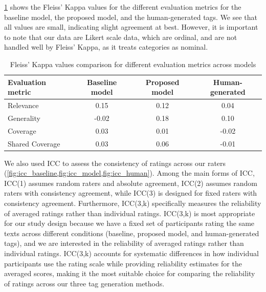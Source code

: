 \cref{tab:fleiss_kappa_comparison} shows the Fleiss' Kappa values for the different evaluation metrics for the baseline model, the proposed model, and the human-generated tags. We see that all values are small, indicating slight agreement at best. However, it is important to note that our data are Likert scale data, which are ordinal, and are not handled well by Fleiss' Kappa, as it treats categories as nominal.

\begin{table}[h]
    \centering
    \begin{tabular}{lccc}
        \hline
        \textbf{Evaluation metric} & \textbf{Baseline model} & \textbf{Proposed model} & \textbf{Human-generated} \\
        \hline
        Relevance                  & 0.15              & 0.12                    & 0.04                     \\
        Generality                 & -0.02             & 0.18                    & 0.10                     \\
        Coverage                   & 0.03              & 0.01                    & -0.02                    \\
        Shared Coverage            & 0.03              & 0.06                    & -0.01                    \\
        \hline
    \end{tabular}
    \caption{Fleiss' Kappa values comparison for different evaluation metrics across models}
    \label{tab:fleiss_kappa_comparison}
\end{table}

We also used ICC to assess the consistency of ratings across our raters (\cref{fig:icc_baseline,fig:icc_model,fig:icc_human}). Among the main forms of ICC, ICC(1) assumes random raters and absolute agreement, ICC(2) assumes random raters with consistency agreement, while ICC(3) is designed for fixed raters with consistency agreement. Furthermore, ICC(3,k) specifically measures the reliability of averaged ratings rather than individual ratings. ICC(3,k) is most appropriate for our study design because we have a fixed set of participants rating the same texts across different conditions (baseline, proposed model, and human-generated tags), and we are interested in the reliability of averaged ratings rather than individual ratings. ICC(3,k) accounts for systematic differences in how individual participants use the rating scale while providing reliability estimates for the averaged scores, making it the most suitable choice for comparing the reliability of ratings across our three tag generation methods.

